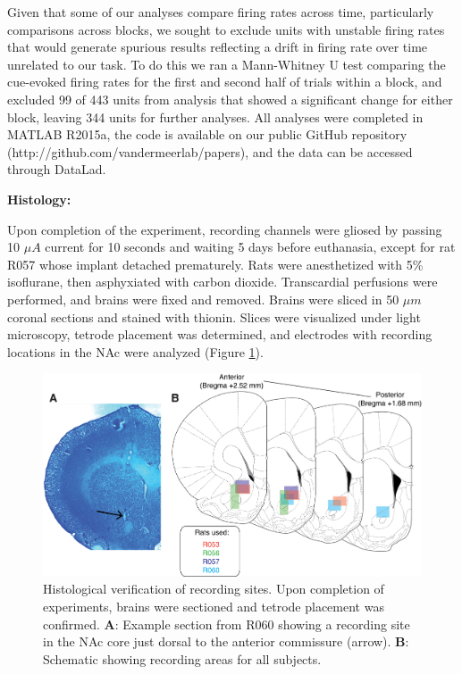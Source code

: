 \documentclass[11pt]{article}
\newcommand{\bsf}[1]{\textbf{#1}}
\begin{document}
{Given that some of our analyses compare firing rates across time,
particularly comparisons across blocks, we sought to exclude units
with unstable firing rates that would generate spurious results
reflecting a drift in firing rate over time unrelated to our task. To
do this we ran a Mann-Whitney U test comparing the cue-evoked firing
rates for the first and second half of trials within a block, and
excluded 99 of 443 units from analysis that showed a significant change for
either block, leaving 344 units for further analyses. All analyses were completed in MATLAB R2015a, the code
is available on our public GitHub repository
(http://github.com/vandermeerlab/papers), and the data can be accessed
through DataLad.

{\bf Histology:}

Upon completion of the experiment, recording channels were gliosed by passing 10 $\mu A$ current for 10 seconds and waiting 5 days before euthanasia, except for rat R057 whose implant detached prematurely. Rats were anesthetized with 5\%
isoflurane, then asphyxiated with carbon dioxide. Transcardial
perfusions were performed, and brains were fixed and removed. Brains
were sliced in 50 $\mu m$ coronal sections and stained with
thionin. Slices were visualized under light microscopy, tetrode
placement was determined, and electrodes with recording locations in
the NAc were analyzed (Figure \ref{fig:histo}).

\begin{figure}[h]
\centering
\includegraphics[width=\textwidth]{Fig 3 - Histology.png}
\caption{Histological verification of recording sites. Upon completion of
  experiments, brains were sectioned and tetrode placement was
  confirmed. \bsf{A}: Example section from R060 showing a recording site in the
  NAc core just dorsal to the anterior commissure (arrow). \bsf{B}:
  Schematic showing recording areas for all subjects.}
\label{fig:histo}
\end{figure}

}
\end{document}
